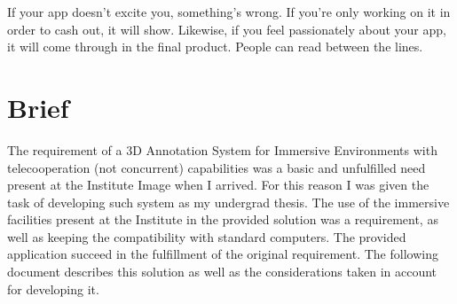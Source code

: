 


If your app doesn't excite you, something's wrong. If you're only working on it in order to cash out, it will show. Likewise, if you feel passionately about your app, it will come through in the final product. People can read between the lines.
\chapter{Brief}
The requirement of a 3D Annotation System for Immersive Environments with telecooperation (not concurrent) capabilities was a basic and unfulfilled need present at the Institute Image when I arrived. For this reason I was given the task of developing such system as my undergrad thesis. The use of the immersive facilities present at the Institute in the provided solution was a requirement, as well as keeping the compatibility with standard computers. The provided application succeed in the fulfillment of the original requirement. The following document describes this solution as well as the considerations taken in account for developing it.